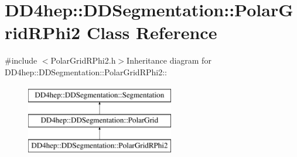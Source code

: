 \hypertarget{class_d_d4hep_1_1_d_d_segmentation_1_1_polar_grid_r_phi2}{
\section{DD4hep::DDSegmentation::PolarGridRPhi2 Class Reference}
\label{class_d_d4hep_1_1_d_d_segmentation_1_1_polar_grid_r_phi2}
}


{\ttfamily \#include $<$PolarGridRPhi2.h$>$}Inheritance diagram for DD4hep::DDSegmentation::PolarGridRPhi2::\begin{figure}[H]
\begin{center}
\leavevmode
\includegraphics[height=3cm]{class_d_d4hep_1_1_d_d_segmentation_1_1_polar_grid_r_phi2}
\end{center}
\end{figure}
